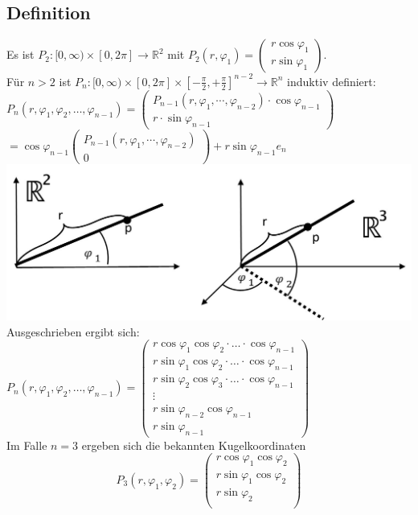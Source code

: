\documentclass[a4paper,11pt]{scrartcl}
\newcommand{\R}{{\ensuremath{\mathbb{R}}}}
\begin{document}
\subsection{Definition}
Es ist $P_2:[0, \infty)\times [0, 2\pi]\to \R^2$ mit $P_2(r,\varphi_1)=\begin{pmatrix}
r\cos\varphi_1\\ r\sin\varphi_1\end{pmatrix}$.\\
Für $n>2$ ist $P_n:[0,\infty)\times[0, 2\pi]\times[-\frac{\pi}{2},+\frac{\pi}{2}]^{n-2}\to \R^n$ induktiv definiert:\\[0.5em]
$P_n(r,\varphi_1, \varphi_2, \ldots, \varphi_{n-1})=\begin{pmatrix}
P_{n-1}(r,\varphi_1,\cdots,\varphi_{n-2})\cdot\cos\varphi_{n-1} \\ r\cdot\sin \varphi_{n-1}\end{pmatrix}
$ \\ $= \cos\varphi_{n-1}\begin{pmatrix}P_{n-1}(r,\varphi_1,\cdots,\varphi_{n-2}) \\ 0 \end{pmatrix}+r\sin\varphi_{n-1}e_n$\\
\includegraphics[scale=0.3]{images/PolarKugelkoordinaten.jpg}\\
Ausgeschrieben ergibt sich:\\
$P_n(r,\varphi_1, \varphi_2, \ldots, \varphi_{n-1})= \begin{pmatrix}r\cos\varphi_1\cos\varphi_2\cdot\ldots\cdot\cos\varphi_{n-1} \\ r\sin\varphi_1\cos\varphi_2\cdot\ldots\cdot\cos\varphi_{n-1} \\
r\sin\varphi_2\cos\varphi_3\cdot\ldots\cdot\cos\varphi_{n-1} \\
\vdots \\
r\sin\varphi_{n-2}\cos\varphi_{n-1} \\
r \sin\varphi_{n-1}
\end{pmatrix}$\\
Im Falle $n=3$ ergeben sich die bekannten Kugelkoordinaten
$$P_3(r,\varphi_1, \varphi_2)=
\begin{pmatrix}r\cos\varphi_1\cos\varphi_2 \\
r\sin\varphi_1\cos\varphi_2\\
r\sin\varphi_2\\ \end{pmatrix}$$
\end{document}
